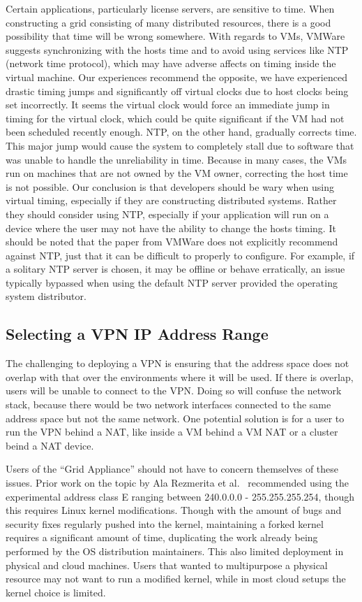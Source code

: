 \documentclass[conference]{IEEEtran}
\begin{document}
Certain applications, particularly license servers, are sensitive to time.
When constructing a grid consisting of many distributed resources, there is a
good possibility that time will be wrong somewhere.  With regards to VMs,
VMWare~\cite{vmware_timing} suggests synchronizing with the hosts time and to
avoid using services like NTP (network time protocol), which may have adverse
affects on timing inside the virtual machine.  Our experiences recommend the
opposite, we have experienced drastic timing jumps and significantly off
virtual clocks due to host clocks being set incorrectly.  It seems the virtual
clock would force an immediate jump in timing for the virtual clock, which
could be quite significant if the VM had not been scheduled recently enough.
NTP, on the other hand, gradually corrects time.  This major jump would cause
the system to completely stall due to software that was unable to handle the
unreliability in time.  Because in many cases, the VMs run on machines that are
not owned by the VM owner, correcting the host time is not possible.  Our
conclusion is that developers should be wary when using virtual timing,
especially if they are constructing distributed systems.  Rather they should
consider using NTP, especially if your application will run on a device where
the user may not have the ability to change the hosts timing.  It should be
noted that the paper from VMWare does not explicitly recommend against NTP,
just that it can be difficult to properly to configure.  For example, if a
solitary NTP server is chosen, it may be offline or behave erratically, an
issue typically bypassed when using the default NTP server provided the
operating system distributor.

\subsection{Selecting a VPN IP Address Range}

The challenging to deploying a VPN is ensuring that the address space does not
overlap with that over the environments where it will be used.  If there is
overlap, users will be unable to connect to the VPN.  Doing so will confuse the
network stack, because there would be two network interfaces connected to the
same address space but not the same network.  One potential solution is for a
user to run the VPN behind a NAT, like inside a VM behind a VM NAT or a
cluster beind a NAT device.

Users of the ``Grid Appliance'' should not have to concern themselves of these
issues.  Prior work on the topic by Ala Rezmerita et al.~\cite{pvc} recommended
using the experimental address class E ranging between 240.0.0.0 -
255.255.255.254, though this requires Linux kernel modifications.  Though with
the amount of bugs and security fixes regularly pushed into the kernel,
maintaining a forked kernel requires a significant amount of time, duplicating
the work already being performed by the OS distribution maintainers.  This also
limited deployment in physical and cloud machines.  Users that wanted to
multipurpose a physical resource may not want to run a modified kernel, while
in most cloud setups the kernel choice is limited.
\end{document}
